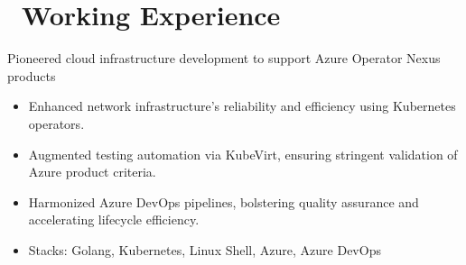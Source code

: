 \documentclass{resume}
\begin{document}
\section{\faUsers\ Working Experience}
Pioneered cloud infrastructure development to support Azure Operator Nexus products
\begin{itemize}
  \item Enhanced network infrastructure's reliability and efficiency using Kubernetes operators.
  \item Augmented testing automation via KubeVirt, ensuring stringent validation of Azure product criteria.
  \item Harmonized Azure DevOps pipelines, bolstering quality assurance and accelerating lifecycle efficiency.
  \item Stacks: Golang, Kubernetes, Linux Shell, Azure, Azure DevOps 
\end{itemize}
\end{document}

